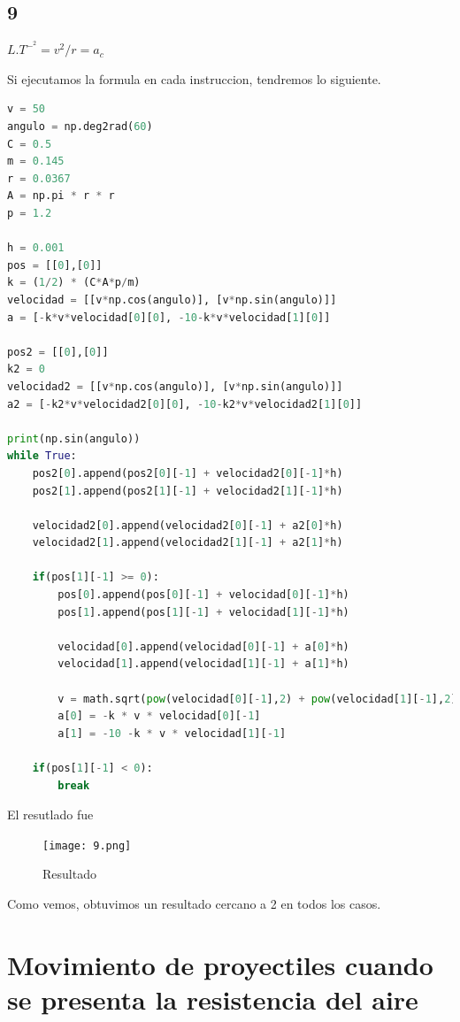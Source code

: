\documentclass{article}
\begin{document}
\subsection{9}
\begin{center}
     $L.T^-^2= v^2/r = a_c$ \\
\end{center}
Si ejecutamos la formula en cada instruccion, tendremos lo siguiente.
\begin{lstlisting}[language=Python,caption=Desafío 1.1]
v = 50
angulo = np.deg2rad(60)
C = 0.5
m = 0.145
r = 0.0367
A = np.pi * r * r
p = 1.2

h = 0.001
pos = [[0],[0]]
k = (1/2) * (C*A*p/m)
velocidad = [[v*np.cos(angulo)], [v*np.sin(angulo)]]
a = [-k*v*velocidad[0][0], -10-k*v*velocidad[1][0]]

pos2 = [[0],[0]]
k2 = 0
velocidad2 = [[v*np.cos(angulo)], [v*np.sin(angulo)]]
a2 = [-k2*v*velocidad2[0][0], -10-k2*v*velocidad2[1][0]]

print(np.sin(angulo))
while True:
    pos2[0].append(pos2[0][-1] + velocidad2[0][-1]*h)
    pos2[1].append(pos2[1][-1] + velocidad2[1][-1]*h)

    velocidad2[0].append(velocidad2[0][-1] + a2[0]*h)
    velocidad2[1].append(velocidad2[1][-1] + a2[1]*h)

    if(pos[1][-1] >= 0):
        pos[0].append(pos[0][-1] + velocidad[0][-1]*h)
        pos[1].append(pos[1][-1] + velocidad[1][-1]*h)

        velocidad[0].append(velocidad[0][-1] + a[0]*h)
        velocidad[1].append(velocidad[1][-1] + a[1]*h)

        v = math.sqrt(pow(velocidad[0][-1],2) + pow(velocidad[1][-1],2))
        a[0] = -k * v * velocidad[0][-1]
        a[1] = -10 -k * v * velocidad[1][-1]

    if(pos[1][-1] < 0):
        break
\end{lstlisting}
El resutlado fue
\begin{figure}[H]
    \centering
    \texttt{[image: 9.png]}
    \caption{Resultado}
\end{figure}
Como vemos, obtuvimos un resultado cercano a 2 en todos los casos.

\section{Movimiento de proyectiles cuando se presenta la resistencia
del aire}
\end{document}
